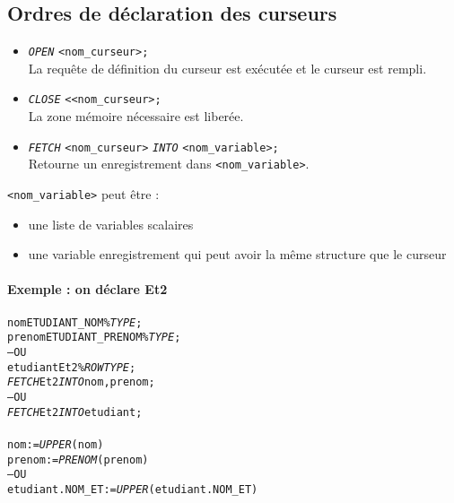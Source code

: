 \documentclass[10pt]{article}
\begin{document}
        \subsection{Ordres de déclaration des curseurs}
            \begin{itemize}
                \item \emph{\texttt{OPEN}} \texttt{<nom\_curseur>;}\\
                    La requête de définition du curseur est exécutée et le curseur est rempli.
                \item \emph{\texttt{CLOSE}} \texttt{<<nom\_curseur>;}\\
                    La zone mémoire nécessaire est liberée.
                \item \emph{\texttt{FETCH}} \texttt{<nom\_curseur>} \emph{\texttt{INTO}} \texttt{<nom\_variable>;}\\
                    Retourne un enregistrement dans \texttt{<nom\_variable>}.
            \end{itemize}

            \texttt{<nom\_variable>} peut être :
            \begin{itemize}
                \item une liste de variables scalaires
                \item une variable enregistrement qui peut avoir la même structure que le curseur
            \end{itemize}

            \newpage
            \paragraph{Exemple : on déclare Et2}
                \begin{alltt}
                    \begin{tabbing}
                        nom ETUDIANT_NOM\%\emph{TYPE};\\
                        prenom ETUDIANT_PRENOM\%\emph{TYPE};\\
                        -- OU\\
                        etudiant Et2\%\emph{ROWTYPE};
                        \\
                        \emph{FETCH} Et2 \emph{INTO} nom, prenom;\\
                        -- OU\\
                        \emph{FETCH} Et2 \emph{INTO} etudiant;\\
                        \\
                        nom:=\emph{UPPER}(nom)\\
                        prenom:=\emph{PRENOM}(prenom)\\
                        -- OU\\
                        etudiant.NOM_ET:=\emph{UPPER}(etudiant.NOM_ET)
                    \end{tabbing}
                \end{alltt}
\end{document}
